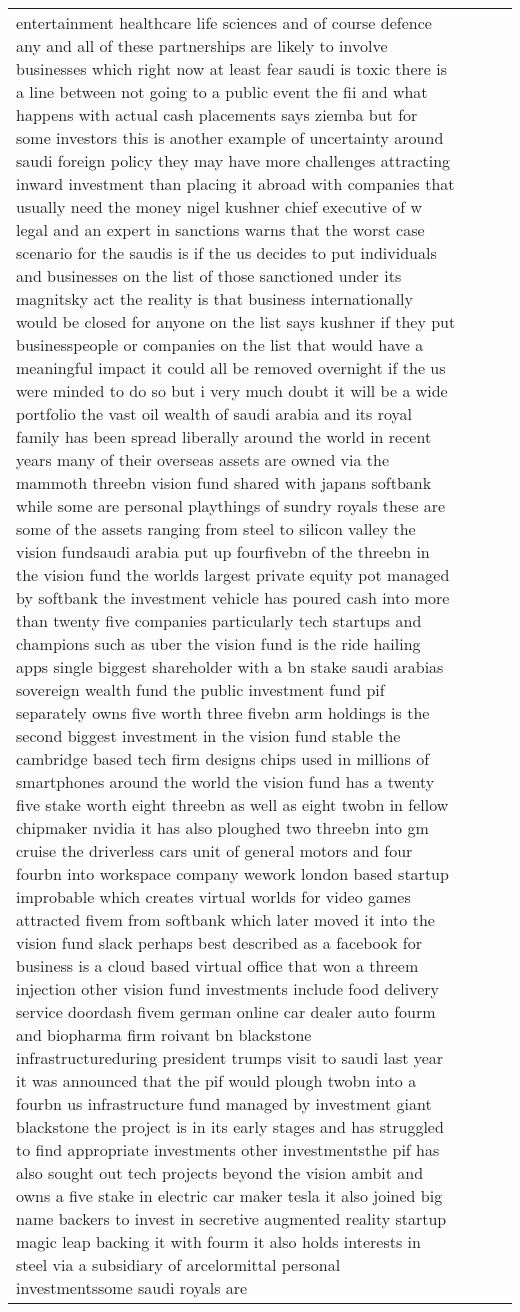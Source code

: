 \documentclass[]{article}
\begin{document}
\begin{table}[!h]
{\begin{tabular}[t]{llll}
entertainment healthcare life sciences and of course defence any and all of these partnerships are likely to involve businesses which right now at least fear saudi is toxic there is a line between not going to a public event the fii and what happens with actual cash placements says ziemba but for some investors this is another example of uncertainty around saudi foreign policy they may have more challenges attracting inward investment than placing it abroad with companies that usually need the money nigel kushner chief executive of w legal and an expert in sanctions warns that the worst case scenario for the saudis is if the us decides to put individuals and businesses on the list of those sanctioned under its magnitsky act the reality is that business internationally would be closed for anyone on the list says kushner if they put businesspeople or companies on the list that would have a meaningful impact it could all be removed overnight if the us were minded to do so but i very much doubt it will be a wide portfolio the vast oil wealth of saudi arabia and its royal family has been spread liberally around the world in recent years many of their overseas assets are owned via the mammoth threebn vision fund shared with japans softbank while some are personal playthings of sundry royals these are some of the assets ranging from steel to silicon valley the vision fundsaudi arabia put up fourfivebn of the threebn in the vision fund the worlds largest private equity pot managed by softbank the investment vehicle has poured cash into more than twenty five companies particularly tech startups and champions such as uber the vision fund is the ride hailing apps single biggest shareholder with a bn stake saudi arabias sovereign wealth fund the public investment fund pif separately owns five worth three fivebn arm holdings is the second biggest investment in the vision fund stable the cambridge based tech firm designs chips used in millions of smartphones around the world the vision fund has a twenty five stake worth eight threebn as well as eight twobn in fellow chipmaker nvidia it has also ploughed two threebn into gm cruise the driverless cars unit of general motors and four fourbn into workspace company wework london based startup improbable which creates virtual worlds for video games attracted fivem from softbank which later moved it into the vision fund slack perhaps best described as a facebook for business is a cloud based virtual office that won a threem injection other vision fund investments include food delivery service doordash fivem german online car dealer auto fourm and biopharma firm roivant bn blackstone infrastructureduring president trumps visit to saudi last year it was announced that the pif would plough twobn into a fourbn us infrastructure fund managed by investment giant blackstone the project is in its early stages and has struggled to find appropriate investments other investmentsthe pif has also sought out tech projects beyond the vision ambit and owns a five stake in electric car maker tesla it also joined big name backers to invest in secretive augmented reality startup magic leap backing it with fourm it also holds interests in steel via a subsidiary of arcelormittal personal investmentssome saudi royals are 
\end{tabular}}
\end{table}
\end{document}
